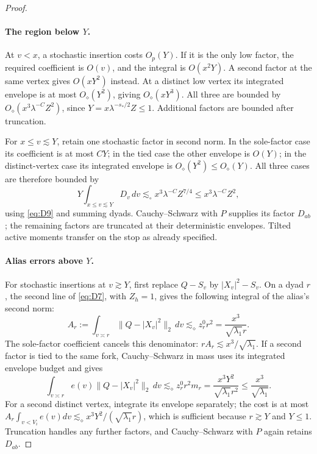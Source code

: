 \begin{proof}
\leavevmode\par
\paragraph{The region below $Y$.}
At $v<x$, a stochastic insertion costs $O_p(Y)$.  If it is
the only low factor, the required coefficient is $O(v)$, and the
integral is $O(x^2Y)$.  A second factor at the same vertex gives
$O(xY^2)$ instead.  At a distinct low vertex its integrated envelope
is at most $O_\diamond(Y^2)$, giving $O_\diamond(xY^3)$.
All three are bounded by $O_\diamond(x^3\lambda^{-C}Z^2)$, since
$Y=x\lambda^{-s_*/2}Z\le1$.  Additional factors are bounded after
truncation.

For $x\le v\lesssim Y$, retain one stochastic factor in second norm.
In the sole-factor case its coefficient is at most $CY$; in the tied
case the other envelope is $O(Y)$; in the distinct-vertex case its
integrated envelope is $O_\diamond(Y^2)\le O_\diamond(Y)$.
All three cases are therefore bounded by
\[
 Y\int_{x\le v\lesssim Y}D_v\,dv
       \lesssim_\circ x^3\lambda^{-C}Z^{7/4}
       \le x^3\lambda^{-C}Z^2,
\]
using \eqref{eq:D9} and summing dyads.  Cauchy--Schwarz with $P$
supplies its factor $D_{ab}$; the remaining factors are truncated at
their deterministic envelopes.  Tilted active moments transfer on the
stop as already specified.

\paragraph{Alias errors above $Y$.}
For stochastic insertions at $v\gtrsim Y$, first replace $Q-S_v$ by
$|X_v|^2-S_v$.  On a dyad $r$, the second line of \eqref{eq:D7}, with
$Z_h=1$, gives the following integral of the alias's second norm:
\[
 A_r:=\int_{v\asymp r}\|Q-|X_v|^2\|_2\,dv
       \lesssim_\diamond z_r^0r^2
       =\frac{x^3}{\sqrt{\lambda_1}r}.
\]
The sole-factor coefficient cancels this denominator: $rA_r\lesssim
x^3/\sqrt{\lambda_1}$.  If a second factor is tied to the same fork,
Cauchy--Schwarz in mass uses its integrated envelope budget and gives
\[
 \int_{v\asymp r}e(v)\|Q-|X_v|^2\|_2\,dv
       \lesssim_\diamond z_r^0r^2m_r
       =\frac{x^3Y^2}{\sqrt{\lambda_1}r^2}
       \le\frac{x^3}{\sqrt{\lambda_1}}.
\]
For a second distinct vertex, integrate its envelope separately; the
cost is at most $A_r\int_{v<V_i}e(v)dv
\lesssim_\diamond x^3Y^2/(\sqrt{\lambda_1}r)$, which is sufficient
because $r\gtrsim Y$ and $Y\le1$.  Truncation handles any further
factors, and Cauchy--Schwarz with $P$ again retains $D_{ab}$.


\end{proof}
